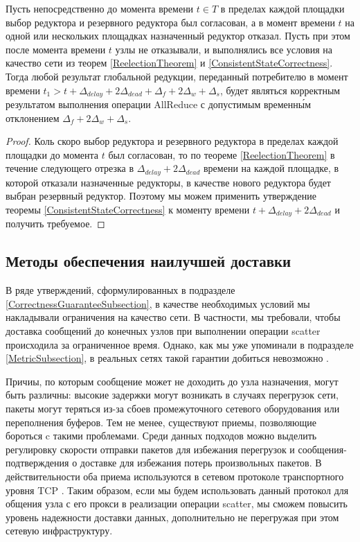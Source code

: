 \begin{consequence}
    Пусть непосредственно до момента времени $t \in T$ в пределах каждой площадки выбор редуктора и резервного редуктора был согласован, а в момент времени $t$ на одной или нескольких площадках назначенный редуктор отказал. Пусть при этом после момента времени $t$ узлы не отказывали, и выполнялись все условия на качество сети из теорем \ref{ReelectionTheorem} и \ref{ConsistentStateCorrectness}. Тогда любой результат глобальной редукции, переданный потребителю в момент времени $t_1 > t + \Delta_{delay} + 2\Delta_{dead} + \Delta_f + 2\Delta_w + \Delta_s$, будет являться корректным результатом выполнения операции AllReduce с допустимым временн\'{ы}м отклонением $\Delta_f + 2\Delta_w + \Delta_s$.
\end{consequence}
\begin{proof}
    Коль скоро выбор редуктора и резервного редуктора в пределах каждой площадки до момента $t$ был согласован, то по теореме \ref{ReelectionTheorem} в течение следующего отрезка в $\Delta_{delay} + 2\Delta_{dead}$ времени на каждой площадке, в которой отказали назначенные редукторы, в качестве нового редуктора будет выбран резервный редуктор. Поэтому мы можем применить утверждение теоремы \ref{ConsistentStateCorrectness} к моменту времени $t + \Delta_{delay} + 2\Delta_{dead}$ и получить требуемое.
\end{proof}

\subsection{Методы обеспечения наилучшей доставки}
\label{BestEffortDeliverySubsection}

В ряде утверждений, сформулированных в подразделе \ref{CorrectnessGuaranteeSubsection}, в качестве необходимых условий мы накладывали ограничения на качество сети. В частности, мы требовали, чтобы доставка сообщений до конечных узлов при выполнении операции scatter происходила за ограниченное время. Однако, как мы уже упоминали в подразделе \ref{MetricSubsection}, в реальных сетях такой гарантии добиться невозможно \cite{networking:best-effort-service}.

Причиы, по которым сообщение может не доходить до узла назначения, могут быть различны: высокие задержки могут возникать в случаях перегрузок сети, пакеты могут теряться из-за сбоев промежуточного сетевого оборудования или переполнения буферов. Тем не менее, существуют приемы, позволяющие бороться c такими проблемами. Среди данных подходов можно выделить регулировку скорости отправки пакетов для избежания перегрузок и сообщения-подтверждения о доставке для избежания потерь произвольных пакетов. В действительности оба приема используются в сетевом протоколе транспортного уровня TCP \cite{RFC0793, RFC5681}. Таким образом, если мы будем использовать данный протокол для общения узла с его прокси в реализации операции scatter, мы сможем повысить уровень надежности доставки данных, дополнительно не перегружая при этом сетевую инфраструктуру.

